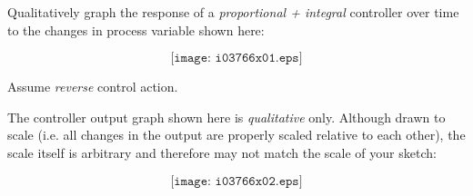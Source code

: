 

Qualitatively graph the response of a {\it proportional + integral} controller over time to the changes in process variable shown here:

$$\texttt{[image: i03766x01.eps]}$$

Assume {\it reverse} control action.







The controller output graph shown here is {\it qualitative} only.  Although drawn to scale (i.e. all changes in the output are properly scaled relative to each other), the scale itself is arbitrary and therefore may not match the scale of your sketch:

$$\texttt{[image: i03766x02.eps]}$$










